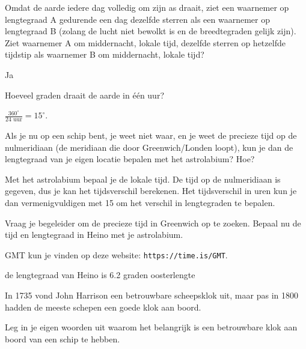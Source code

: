 \begin{opgave}
Omdat de aarde iedere dag volledig om zijn as draait, ziet een waarnemer op lengtegraad A gedurende een dag dezelfde sterren als een waarnemer op lengtegraad B (zolang de lucht niet bewolkt is en de breedtegraden gelijk zijn). Ziet waarnemer A om middernacht, lokale tijd, dezelfde sterren op hetzelfde tijdstip als waarnemer B om middernacht, lokale tijd?
\begin{antwoord}
 Ja
\end{antwoord}
\end{opgave}

\begin{opgave}
Hoeveel graden draait de aarde in \'e\'en uur?
\begin{antwoord}
 $\frac{360^{\circ}}{24 \textrm{ uur}} = 15^{\circ}$.
\end{antwoord}
\end{opgave}

\begin{opgave}
 Als je nu op een schip bent, je weet niet waar, en je weet de precieze tijd op de nulmeridiaan (de meridiaan die door Greenwich/Londen loopt), kun je dan de lengtegraad van je eigen locatie bepalen met het astrolabium? Hoe?
 \begin{antwoord}
  Met het astrolabium bepaal je de lokale tijd. De tijd op de nulmeridiaan is gegeven, dus je kan het tijdsverschil berekenen. Het tijdsverschil in uren kun je dan vermenigvuldigen met 15 om het verschil in lengtegraden te bepalen.
 \end{antwoord}
\end{opgave}

\begin{opgave}
 Vraag je begeleider om de precieze tijd in Greenwich op te zoeken. Bepaal nu de tijd en lengtegraad in Heino met je astrolabium.
 \begin{hint}
  GMT kun je vinden op deze website: \texttt{https://time.is/GMT}.
 \end{hint}
\begin{antwoord}
 de lengtegraad van Heino is 6.2 graden oosterlengte
\end{antwoord}
\end{opgave}

In 1735 vond John Harrison een betrouwbare scheepsklok uit, maar pas in 1800 hadden de meeste schepen een goede klok aan boord.
\begin{opgave}
 Leg in je eigen woorden uit waarom het belangrijk is een betrouwbare klok aan boord van een schip te hebben.
\end{opgave}


\newpage
